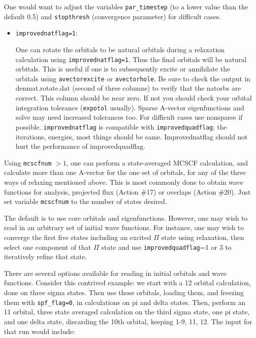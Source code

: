\documentclass[10pt,leqno, oneside]{book}
\begin{document}
One would want to adjust the variables \verb#par_timestep# (to a lower value than the default 0.5) and \verb#stopthresh# (convergence parameter) for difficult cases.
\

\begin{itemize}
\item{\verb#improvednatflag=1#:  \

One can rotate the orbitals to be natural orbitals during a relaxation calculation using \verb#improvednatflag=1#.  Thus the final orbitals will be natural orbitals.  This is useful if one is to subsequently excite or annihilate the orbitals using \verb#avectorexcite# or \verb#avectorhole#.  Be sure to check the output in denmat.rotate.dat (second of three columns) to verify that the natorbs are correct.  This column should be near zero.  If not you should check your orbital integration tolerance (\verb#expotol# usually).  Sparse A-vector eigenfunctions and solve may need increased tolerances too.  For difficult cases use nonsparse if possible.  \verb#improvednatflag# is compatible with \verb#improvedquadflag#; the iterations, energies, most things should be same.  
Improvednatflag should not hurt the performance of improvedquadflag.}
\end{itemize}

Using \verb#mcscfnum# $>1$, one can perform a state-averaged MCSCF calculation, and calculate more than one A-vector for the one set of orbitals,
for any of the three ways of relaxing mentioned above.  This is most commonly done 
to obtain wave functions for analysis,
projected flux (Action \#17) or overlaps (Action \#20).  Just set variable \verb#mcscfnum# to the number of states desired.

The default is to use core orbitals and eigenfunctions.  However, one may wish to read in an arbitrary set of initial wave functions.  For instance, one may wish to converge the first five states including an excited $\Pi$ state using relaxation, then select one component of that $\Pi$ state and use \verb#improvedquadflag#=1 or 3 to iteratively refine that state.

There are several options available for reading in initial orbitals and wave functions.  Consider this contrived example: we start with a 12 orbital 
calculation, done on three sigma states.  Then use those orbitals, loading them, and freezing them with \verb#spf_flag=0#, in calculations on
pi and delta states.  Then, perform an 11 orbital, three state averaged calculation on the third sigma state, one pi state, 
and one delta state, discarding the 10th orbital, keeping 1-9, 11, 12.  The input for that run would include:
\end{document}
